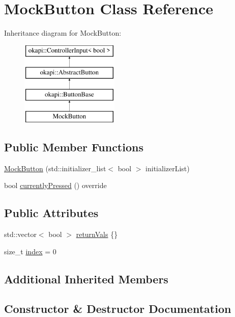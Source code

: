 \hypertarget{classMockButton}{}\section{Mock\+Button Class Reference}
\label{classMockButton}
Inheritance diagram for Mock\+Button\+:\begin{figure}[H]
\begin{center}
\leavevmode
\includegraphics[height=4.000000cm]{classMockButton}
\end{center}
\end{figure}
\subsection*{Public Member Functions}
\begin{DoxyCompactItemize}
\item 
\mbox{\hyperlink{classMockButton_a979f4ae3c3186482826f9a15d2e94b46}{Mock\+Button}} (std\+::initializer\+\_\+list$<$ bool $>$ initializer\+List)
\item 
bool \mbox{\hyperlink{classMockButton_a3b2cee3f3164c665ad4f4184ef05bcc2}{currently\+Pressed}} () override
\end{DoxyCompactItemize}
\subsection*{Public Attributes}
\begin{DoxyCompactItemize}
\item 
std\+::vector$<$ bool $>$ \mbox{\hyperlink{classMockButton_a0c5466c19c4adec313c92a9ada02d3f2}{return\+Vals}} \{\}
\item 
size\+\_\+t \mbox{\hyperlink{classMockButton_af6dd5ac3c3d59f8536984cc8c30d377c}{index}} = 0
\end{DoxyCompactItemize}
\subsection*{Additional Inherited Members}


\subsection{Constructor \& Destructor Documentation}
\mbox{\label{classMockButton_a979f4ae3c3186482826f9a15d2e94b46}} 
